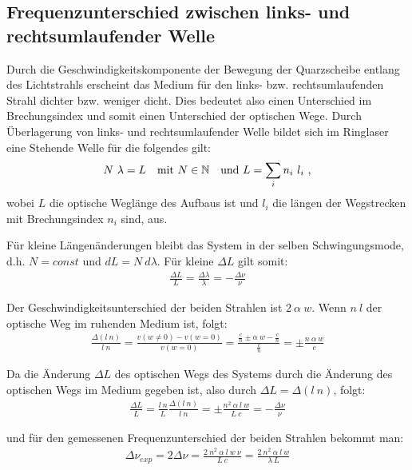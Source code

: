 \documentclass[12pt]{article}
\begin{document}
\subsection{Frequenzunterschied zwischen links- und rechtsumlaufender Welle}
Durch die Geschwindigkeitskomponente der Bewegung der Quarzscheibe entlang des Lichtstrahls erscheint das Medium für den links- bzw. rechtsumlaufenden
Strahl dichter bzw. weniger dicht. Dies bedeutet also einen Unterschied im Brechungsindex und somit einen Unterschied der optischen Wege. Durch Überlagerung
von links- und rechtsumlaufender Welle bildet sich im Ringlaser eine Stehende Welle für die folgendes gilt:
\begin{align}
 N \ \lambda = L \quad \textnormal{mit} \ N \in \mathbb N \quad \textnormal{und} \ L = \sum_{i}{n_i \ l_i} \ \textnormal{,}
\end{align}
wobei $L$ die optische Weglänge des Aufbaus ist und $l_i$ die längen der Wegstrecken mit Brechungsindex $n_i$ sind,
aus.

Für kleine Längenänderungen bleibt das System in der selben Schwingungsmode, d.h. $N = const$ und $dL = N \ d\lambda$. Für kleine $\Delta L$ gilt somit:
\begin{align}
 \frac{\Delta L}{L} = \frac{\Delta\lambda}{\lambda} = -\frac{\Delta \nu}{\nu}
\end{align}

Der Geschwindigkeitsunterschied der beiden Strahlen ist $2 \ \alpha \ w$. Wenn $n \ l$ der optische Weg im ruhenden Medium ist, folgt:
\begin{align}
 \frac{\Delta (l \ n)}{l \ n} = \frac{v(w \neq 0) - v(w = 0)}{v(w = 0)} = \frac{\frac{c}{n} \pm \alpha \ w - \frac{c}{n}}{\frac{c}{n}}
 = \pm \frac{n \ \alpha \ w}{c}
\end{align}

Da die Änderung $\Delta L$ des optischen Wegs des Systems durch die Änderung des optischen Wegs im Medium gegeben ist, also durch
$\Delta L = \Delta(l \ n)$, folgt:
\begin{align}
 \frac{\Delta L}{L} = \frac{l \ n}{L} \frac{\Delta(l \ n)}{l \ n} = \pm \frac{n^2 \ \alpha \ l \ w}{L \ c} = -\frac{\Delta \nu}{\nu}
\end{align}

und für den gemessenen Frequenzunterschied der beiden Strahlen bekommt man:
\begin{align}
\label{nuexp} \Delta\nu_{exp} = 2 \Delta\nu = \frac{2 \ n^2 \ \alpha \ l \ w \ \nu}{L \ c} = \frac{2 \ n^2 \ \alpha \ l \ w}{\lambda \ L}
\end{align}
\end{document}
